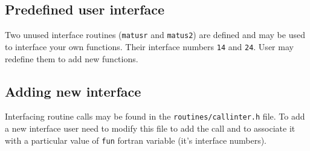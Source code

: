 \subsection {Predefined user interface}

Two unused interface routines ({\tt matusr} and {\tt matus2}) are
defined and may be used to interface your own functions. Their
interface numbers {\tt 14} and {\tt 24}. User may redefine them to add
new functions. 

\subsection {Adding new interface}
Interfacing routine calls may be found in the 
{\tt   routines/callinter.h}  file. To add a new interface user need
to modify this file to add the call and to associate it with a
particular value of {\tt fun} fortran variable (it's interface numbers).

\newpage

\tableofcontents

\listoftables


